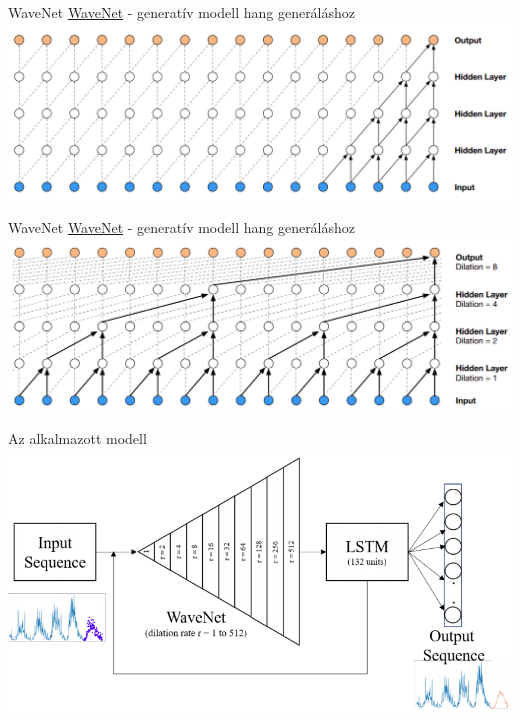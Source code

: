 \begin{frame}{WaveNet}
    \href{https://deepmind.com/blog/article/wavenet-generative-model-raw-audio}{WaveNet} - generatív modell hang generáláshoz
    \centering
    \includegraphics[width=1.0\textwidth]{figures/wavenet_casual_cnn.png}
\end{frame}

\begin{frame}{WaveNet}
    \href{https://deepmind.com/blog/article/wavenet-generative-model-raw-audio}{WaveNet} - generatív modell hang generáláshoz
    \centering
    \includegraphics[width=1.0\textwidth]{figures/wavenet_dilated_cnn.png}
\end{frame}

\begin{frame}{Az alkalmazott modell}
    \centering
    \includegraphics[width=1.0\textwidth]{figures/solar_cycle_model.png}
\end{frame}

